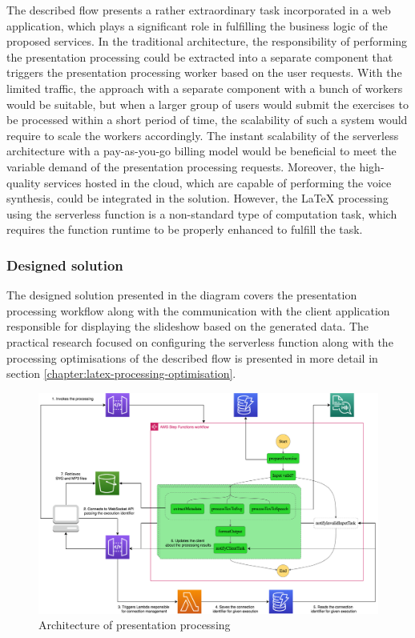 The described flow presents a rather extraordinary task incorporated in a web application, which plays a significant role in fulfilling the business logic of the proposed services.
In the traditional architecture, the responsibility of performing the presentation processing could be extracted into a separate component that triggers the presentation processing worker based on the user requests.
With the limited traffic, the approach with a separate component with a bunch of workers would be suitable, but when a larger group of users would submit the exercises to be processed within a short period of time, the scalability of such a system would require to scale the workers accordingly.
The instant scalability of the serverless architecture with a pay-as-you-go billing model would be beneficial to meet the variable demand of the presentation processing requests. Moreover, the high-quality services hosted in the cloud, which are capable of performing the voice synthesis, could be integrated in the solution.
However, the LaTeX processing using the serverless function is a non-standard type of computation task, which requires the function runtime to be properly enhanced to fulfill the task.

\subsubsection{Designed solution}

The designed solution presented in the diagram covers the presentation processing workflow along with the communication with the client application responsible for displaying the slideshow based on the generated data. 
The practical research focused on configuring the serverless function along with the processing optimisations of the described flow is presented in more detail in section \ref{chapter:latex-processing-optimisation}.

\begin{figure}[H]
   \centering
   \includegraphics[width=1\textwidth]{assets/04-serverless-for-web-apps/euclidArchitecture.png}
   \caption{Architecture of presentation processing}
   \label{fig:euclid-web-app}
\end{figure}

